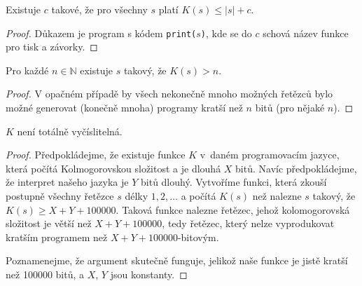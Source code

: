 \begin{theorem}
    Existuje $c$ takové, že pro všechny $s$ platí
    $K(s) \leq |s| + c$.
\end{theorem}

\begin{proof}
Důkazem je program s kódem \verb|print(|$s$\verb|)|, kde se do $c$
schová název funkce pro tisk a závorky.
\end{proof}

\begin{theorem}
    Pro každé $n \in \mathbb{N}$ existuje $s$ takový, že $K(s) > n$.
\end{theorem}

\begin{proof}
V opačném případě by všech nekonečně mnoho možných řetězců bylo možné
generovat (konečně mnoha) programy kratší než $n$ bitů (pro nějaké $n$).
\end{proof}

\begin{theorem}
    $K$ není totálně vyčíslitelná.
\end{theorem}

\begin{proof}
Předpokládejme, že existuje funkce $K$ v~daném programovacím jazyce,
která počítá Kolmogorovskou složitost
a je dlouhá $X$ bitů. Navíc předpokládejme, že interpret našeho jazyka
je $Y$ bitů dlouhý. Vytvoříme funkci, která zkouší postupně všechny řetězce $s$ délky
$1,2,\ldots$ a počítá $K(s)$ než nalezne $s$ takový, že $K(s) \geq
X+Y+100000$. Taková funkce nalezne řetězec, jehož kolomogorovská
složitost je větší než $X+Y+100000$, tedy řetězec, který nelze
vyprodukovat kratším programem než $X+Y+100000$-bitovým.

Poznamenejme, že argument skutečně funguje, jelikož naše funkce je jistě
kratší než 100000 bitů, a $X$, $Y$ jsou konstanty.
\end{proof}

